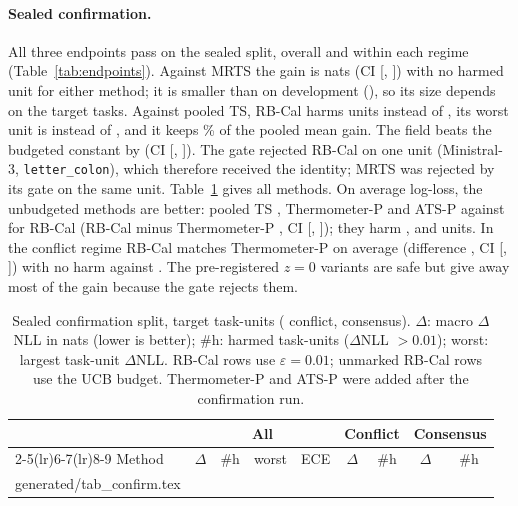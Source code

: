 \documentclass[11pt]{article}
\makeatletter
\theoremstyle{remark}
\newcommand{\inputtable}[1]{\@@input #1 }
\makeatother
\begin{document}
\paragraph{Sealed confirmation.}
All three endpoints pass on the sealed split, overall and within each regime (Table~\ref{tab:endpoints}).
Against MRTS the gain is \EOneDiff{} nats (CI [\EOneLo, \EOneHi]) with no harmed unit for either method; it is smaller than on development (\EOneDevDiff), so its size depends on the target tasks.
Against pooled TS, RB-Cal harms \ETwoHarmP{} units instead of \ETwoHarmPooled, its worst unit is \ETwoWorstP{} instead of \ETwoWorstPooled, and it keeps \ETwoRetain\% of the pooled mean gain.
The field beats the budgeted constant by \EThreeDiff{} (CI [\EThreeLo, \EThreeHi]).
The gate rejected RB-Cal on one unit (Ministral-3, \texttt{letter\_colon}), which therefore received the identity; MRTS was rejected by its gate on the same unit.
Table~\ref{tab:confirm} gives all methods.
On average log-loss, the unbudgeted methods are better: pooled TS \ConfPooledDelta, Thermometer-P \ConfThermoDelta{} and ATS-P \ConfAtsDelta{} against \ConfPrimDelta{} for RB-Cal (RB-Cal minus Thermometer-P \ConfThermoGap, CI [\ConfThermoGapLo, \ConfThermoGapHi]); they harm \ConfPooledHarm, \ConfThermoHarm{} and \ConfAtsHarm{} units.
In the conflict regime RB-Cal matches Thermometer-P on average (difference \ConfConflictThermoGap, CI [\ConfConflictThermoGapLo, \ConfConflictThermoGapHi]) with no harm against \ConfConflictThermoHarm.
The pre-registered $z=0$ variants are safe but give away most of the gain because the gate rejects them.

\begin{table}[t]
\centering\small
\caption{Sealed confirmation split, \NConfirm{} target task-units (\NConfirmConflict{} conflict, \NConfirmConsensus{} consensus). $\Delta$: macro $\Delta$NLL in nats (lower is better); \#h: harmed task-units ($\Delta$NLL $>0.01$); worst: largest task-unit $\Delta$NLL. RB-Cal rows use $\varepsilon=0.01$; unmarked RB-Cal rows use the UCB budget. Thermometer-P and ATS-P were added after the confirmation run.}
\label{tab:confirm}
\begin{tabular}{lcccccccc}
\toprule
& \multicolumn{4}{c}{All} & \multicolumn{2}{c}{Conflict} & \multicolumn{2}{c}{Consensus}\\
\cmidrule(lr){2-5}\cmidrule(lr){6-7}\cmidrule(lr){8-9}
Method & $\Delta$ & \#h & worst & ECE & $\Delta$ & \#h & $\Delta$ & \#h\\
\midrule
\inputtable{generated/tab_confirm.tex}
\bottomrule
\end{tabular}
\end{table}
\end{document}
